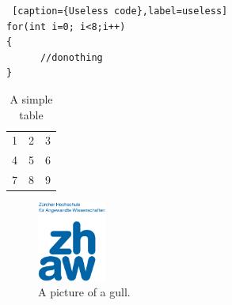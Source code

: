 %
%
\begin{lstlisting} [caption={Useless code},label=useless]
for(int i=0; i<8;i++) 
{
      //donothing
}
\end{lstlisting}


%
%
\cite{Sch96:crypt}


%
%
\begin{table}[h!]
  \begin{center}
    \begin{tabular}{| l c r |}
    \hline
    1 & 2 & 3 \\
    4 & 5 & 6 \\
    7 & 8 & 9 \\
    \hline
    \end{tabular}
  \end{center}
  \caption{A simple table}
\end{table}

%
%
\begin{figure}[h!]
  \centering
    \includegraphics[width=0.2\textwidth]{img/logo}
  \caption{A picture of a gull.}
\end{figure}